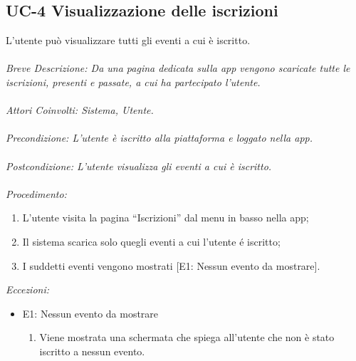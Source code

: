 \subsection{UC-4 Visualizzazione delle iscrizioni}
L'utente può visualizzare tutti gli eventi a cui è iscritto.
\\
\\
\textit{Breve Descrizione: Da una pagina dedicata sulla app vengono scaricate tutte le iscrizioni, presenti e passate, a cui ha partecipato l'utente.} 
\\
\\
\textit{Attori Coinvolti: Sistema, Utente.}
\\
\\
\textit{Precondizione: L'utente è iscritto alla piattaforma e loggato nella app.}
\\
\\
\textit{Postcondizione: L'utente visualizza gli eventi a cui è iscritto.}
\\
\\
\textit{Procedimento:}
\begin{enumerate}
	\item L'utente visita la pagina ``Iscrizioni'' dal menu in basso nella app;
	\item Il sistema scarica solo quegli eventi a cui l'utente é iscritto;
	\item I suddetti eventi vengono mostrati [E1: Nessun evento da mostrare].
\end{enumerate}


\textit{Eccezioni:}
\begin{itemize}
	\item E1: Nessun evento da mostrare
	\begin{enumerate}
		\item Viene mostrata una schermata che spiega all'utente che non è stato iscritto a nessun evento.
	\end{enumerate}
\end{itemize}